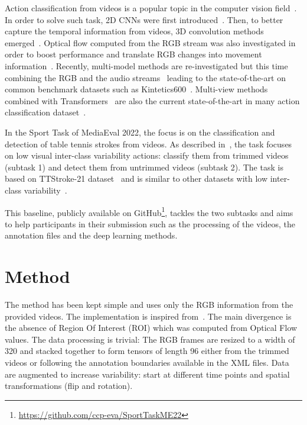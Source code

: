 \documentclass[
]{ceurart}
\begin{document}
Action classification from videos is a popular topic in the computer vision field~\cite{Dataset:UCF101:2012,Dataset:AVA:2018,Dataset:AVA_Kinetics:2020,DBLP:conf/nips/PiergiovanniR20}. In order to solve such task, 2D CNNs were first introduced~\cite{Hakan:2018, NN:SimonyanTwoStream:2014}. Then, to better capture the temporal information from videos, 3D convolution methods emerged~\citep{NN:3DCNN_first:2007,NN:3DCNN:2017}. Optical flow computed from the RGB stream was also investigated in order to boost performance and translate RGB changes into movement information~\cite{NN:I3DCarreira:2017,PeCBMI:2018}. Recently, multi-model methods are re-investigated but this time combining the RGB and the audio streams~\cite{zellers2022merlotreserve} leading to the state-of-the-art on common benchmark datasets such as Kintetics600~\cite{Dataset:Kinetics600:2018}. Multi-view methods combined with Transformers~\cite{dehghani2021scenic} are also the current state-of-the-art in many action classification dataset~\cite{Dataset:EpicKitchens,Dataset:MomentsInTime:2020}.
\par
In the Sport Task of MediaEval 2022, the focus is on the classification and detection of table tennis strokes from videos. As described in~\cite{mediaeval/Martin/2022/overview}, the task focuses on low visual inter-class variability actions: classify them from trimmed videos (subtask 1) and detect them from untrimmed videos (subtask 2). The task is based on TTStroke-21 dataset~\cite{PeMTAP:2020} and is similar to other datasets with low inter-class variability~\cite{Dataset:Gym:2020,Dataset:Diving48:2018,Dataset:EpicKitchens,Mocap:2013}. 






This baseline, publicly available on GitHub\footnote{\url{https://github.com/ccp-eva/SportTaskME22}}, tackles the two subtasks and aims to help participants in their submission such as the processing of the videos, the annotation files and the deep learning methods.












\section{Method}
\label{sec:dataset}

The method has been kept simple and uses only the RGB information from the provided videos. The implementation is inspired from~\cite{PeICPR:2020}. The main divergence is the absence of Region Of Interest (ROI) which was computed from Optical Flow values. The data processing is trivial: The RGB frames are resized to a width of 320 and stacked together to form tensors of length 96 either from the trimmed videos or following the annotation boundaries available in the XML files. Data are augmented to increase variability: start at different time points and spatial transformations (flip and rotation).
\end{document}
